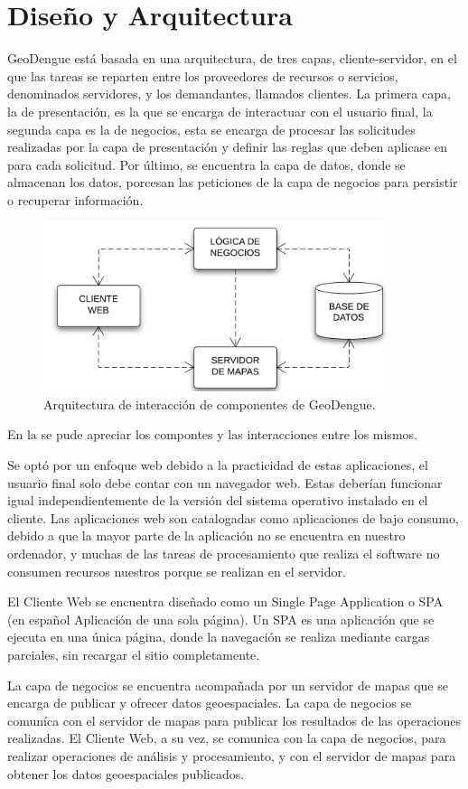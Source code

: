 \section{Diseño y Arquitectura}
GeoDengue está basada en una arquitectura, de tres capas, cliente-servidor, en el que las tareas
se reparten entre los proveedores de recursos o servicios, denominados servidores, y los
demandantes, llamados clientes. La primera capa, la de presentación, es la que se encarga de
interactuar con el usuario final, la segunda capa es la de negocios, esta se encarga de procesar
las solicitudes realizadas por la capa de presentación y definir las reglas que deben aplicase en
para cada solicitud. Por último, se encuentra la capa de datos, donde se almacenan los datos,
porcesan las peticiones de la capa de negocios para persistir o recuperar información.

\begin{figure}
\centering
\includegraphics[width=0.9\textwidth]{capitulo-5/graphics/arquitectura-completa.png}
\caption{\label{fig:arquitectura-completa}Arquitectura de interacción de componentes de GeoDengue.}
\end{figure}

En la  se pude apreciar los compontes y las interacciones entre
los mismos.

Se optó por un enfoque web debido a la practicidad de estas aplicaciones, el usuario final solo
debe contar con un navegador web. Estas deberían funcionar igual independientemente de la versión
del sistema operativo instalado en el cliente. Las aplicaciones web son catalogadas como
aplicaciones de bajo consumo, debido a que la mayor parte de la aplicación no se encuentra en
nuestro ordenador, y muchas de las tareas de procesamiento que realiza el software no consumen
recursos nuestros porque se realizan en el servidor.

El Cliente Web se encuentra diseñado como un Single Page Application o SPA (en español Aplicación
de una sola página). Un SPA es una aplicación que se ejecuta en una única página, donde la
navegación se realiza mediante cargas parciales, sin recargar el sitio completamente.

La capa de negocios se encuentra acompañada por un servidor de mapas que se encarga de publicar y
ofrecer datos geoespaciales. La capa de negocios se comuníca con el servidor de mapas para
publicar los resultados de las operaciones realizadas. El Cliente Web, a su vez, se comunica con
la capa de negocios, para realizar operaciones de análisis y procesamiento, y con el servidor de
mapas para obtener los datos geoespaciales publicados.
